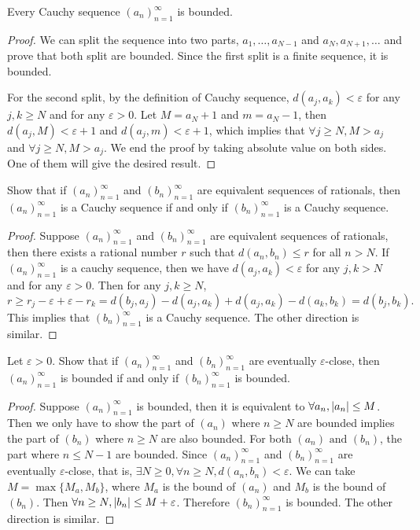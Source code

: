 \begin{exercise}
  Every Cauchy sequence $(a_n)_{n=1}^\infty$ is bounded.
\end{exercise}
\begin{proof}
  We can split the sequence into two parts, $a_1, \dots, a_{N-1}$ and $a_N, a_{N+1}, \dots$ and prove that both split are bounded.
  Since the first split is a finite sequence, it is bounded. 

  For the second split, by the definition of Cauchy sequence, $d(a_j, a_k) < \varepsilon$ for any $j, k \geq N$ and for any $\varepsilon > 0$.
  Let $M = a_N + 1$ and $m = a_N - 1$, then $d(a_j, M) < \varepsilon + 1$ and $d(a_j, m) < \varepsilon + 1$,
  which implies that $\forall j \geq N, M > a_j$ and $\forall j \geq N, M > a_j$. We end the proof by taking absolute value on both sides.
  One of them will give the desired result.
\end{proof}

\begin{exercise}
  Show that if $(a_n)_{n=1}^\infty$ and $(b_n)_{n=1}^\infty$ are equivalent sequences of rationals,
  then $(a_n)_{n=1}^\infty$ is a Cauchy sequence if and only if $(b_n)_{n=1}^\infty$ is a Cauchy sequence.
\end{exercise}
\begin{proof}
  Suppose $(a_n)_{n=1}^\infty$ and $(b_n)_{n=1}^\infty$ are equivalent sequences of rationals,
  then there exists a rational number $r$ such that $d(a_n, b_n) \leq r$ for all $n > N$.
  If $(a_n)_{n=1}^\infty$ is a cauchy sequence, then we have $d(a_j, a_k) < \varepsilon$ for any $j, k > N$ and for any $\varepsilon > 0$.
  Then for any $j, k \geq N$, $$r \geq r_j - \varepsilon + \varepsilon - r_k = d(b_j, a_j) - d(a_j, a_k) + d(a_j, a_k)- d(a_k, b_k) = d(b_j, b_k).$$
  This implies that $(b_n)_{n=1}^\infty$ is a Cauchy sequence. The other direction is similar.
\end{proof}

\begin{exercise}
  Let $\varepsilon > 0$. Show that if $(a_n)_{n=1}^\infty$ and $(b_n)_{n=1}^\infty$ are eventually $\varepsilon$-close,
  then $(a_n)_{n=1}^\infty$ is bounded if and only if $(b_n)_{n=1}^\infty$ is bounded.
\end{exercise}
\begin{proof}
  Suppose $(a_n)_{n=1}^\infty$ is bounded, then it is equivalent to $\forall a_n, \abs{a_n} \leq M$. 
  Then we only have to show the part of $(a_n)$ where $n \geq N$ are bounded implies the part of $(b_n)$ where $n \geq N$ are also bounded.
  For both $(a_n) \text{\ and\ } (b_n)$, the part where $n \leq N-1$ are bounded.
  Since $(a_n)_{n=1}^\infty$ and $(b_n)_{n=1}^\infty$ are eventually $\varepsilon$-close, that is, $\exists N \geq 0, \forall n \geq N, d(a_n, b_n) < \varepsilon$.
  We can take $M = \max\{M_a, M_b\}$, where $M_a$ is the bound of $(a_n)$ and $M_b$ is the bound of $(b_n)$.
  Then $\forall n \geq N, \abs{b_n} \leq M + \varepsilon$. Therefore $(b_n)_{n=1}^\infty$ is bounded. The other direction is similar.
\end{proof}

